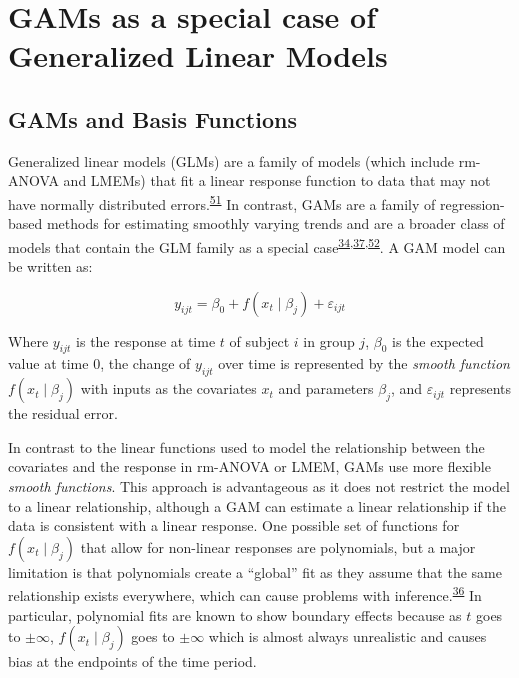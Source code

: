 \documentclass[
]{article}
\begin{document}
\hypertarget{GAM-theory}{%
\section{GAMs as a special case of Generalized Linear Models}\label{GAM-theory}}

\hypertarget{gams-and-basis-functions}{%
\subsection{GAMs and Basis Functions}\label{gams-and-basis-functions}}

Generalized linear models (GLMs) are a family of models (which include rm-ANOVA and LMEMs) that fit a linear response function to data that may not have normally distributed errors.\textsuperscript{\protect\hyperlink{ref-nelder1972}{51}} In contrast, GAMs are a family of regression-based methods for estimating smoothly varying trends and are a broader class of models that contain the GLM family as a special case\textsuperscript{\protect\hyperlink{ref-simpson2018}{34},\protect\hyperlink{ref-wood2017}{37},\protect\hyperlink{ref-hastie1987}{52}}. A GAM model can be written as:

\begin{equation}
  y_{ijt}=\beta_0+f(x_t\mid \beta_j)+\varepsilon_{ijt}
  \label{eq:GAM}
\end{equation}

Where \(y_{ijt}\) is the response at time \(t\) of subject \(i\) in group \(j\), \(\beta_0\) is the expected value at time 0, the change of \(y_{ijt}\) over time is represented by the \emph{smooth function} \(f(x_t\mid \beta_j)\) with inputs as the covariates \(x_t\) and parameters \(\beta_j\), and \(\varepsilon_{ijt}\) represents the residual error.

In contrast to the linear functions used to model the relationship between the covariates and the response in rm-ANOVA or LMEM, GAMs use more flexible \emph{smooth functions}. This approach is advantageous as it does not restrict the model to a linear relationship, although a GAM can estimate a linear relationship if the data is consistent with a linear response. One possible set of functions for \(f(x_t\mid \beta_j)\) that allow for non-linear responses are polynomials, but a major limitation is that polynomials create a ``global'' fit as they assume that the same relationship exists everywhere, which can cause problems with inference.\textsuperscript{\protect\hyperlink{ref-beck1998}{36}} In particular, polynomial fits are known to show boundary effects because as \(t\) goes to \(\pm \infty\), \(f(x_t \mid \beta_j)\) goes to \(\pm \infty\) which is almost always unrealistic and causes bias at the endpoints of the time period.
\end{document}
